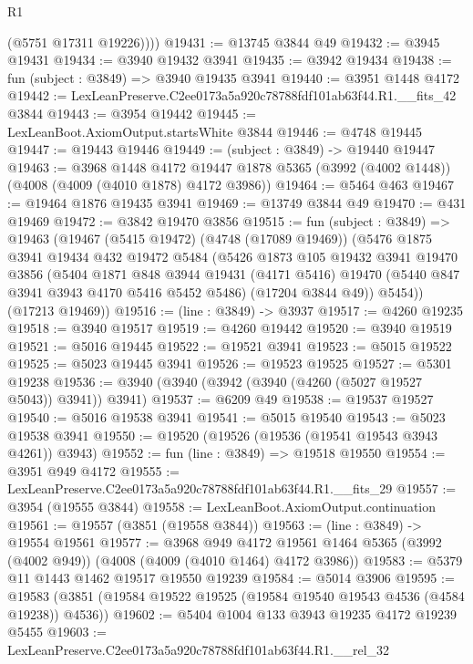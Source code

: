 \begin{lexlean}{R1}
\begin{coremodule}
          (@5751 @17311 @19226))))
@19431 := @13745 @3844 @49
@19432 := @3945 @19431
@19434 := @3940 @19432 @3941
@19435 := @3942 @19434
@19438 := fun (subject : @3849) => @3940 @19435 @3941
@19440 := @3951 @1448 @4172
@19442 := LexLeanPreserve.C2ee0173a5a920c78788fdf101ab63f44.R1.__fits_42 @3844
@19443 := @3954 @19442
@19445 := LexLeanBoot.AxiomOutput.startsWhite @3844
@19446 := @4748 @19445
@19447 := @19443 @19446
@19449 := (subject : @3849) -> @19440 @19447
@19463 := @3968
    @1448
    @4172
    @19447
    @1878
    @5365
    (@3992 (@4002 @1448))
    (@4008 (@4009 (@4010 @1878) @4172 @3986))
@19464 := @5464 @463
@19467 := @19464 @1876 @19435 @3941
@19469 := @13749 @3844 @49
@19470 := @431 @19469
@19472 := @3842 @19470 @3856
@19515 := fun (subject : @3849) =>
  @19463
    (@19467
      (@5415 @19472)
      (@4748 (@17089 @19469))
      (@5476
        @1875
        @3941
        @19434
        @432
        @19472
        @5484
        (@5426
          @1873
          @105
          @19432
          @3941
          @19470
          @3856
          (@5404
            @1871
            @848
            @3944
            @19431
            (@4171 @5416)
            @19470
            (@5440 @847 @3941 @3943 @4170 @5416 @5452 @5486)
            (@17204 @3844 @49))
          @5454))
      (@17213 @19469))
@19516 := (line : @3849) -> @3937
@19517 := @4260 @19235
@19518 := @3940 @19517
@19519 := @4260 @19442
@19520 := @3940 @19519
@19521 := @5016 @19445
@19522 := @19521 @3941
@19523 := @5015 @19522
@19525 := @5023 @19445 @3941
@19526 := @19523 @19525
@19527 := @5301 @19238
@19536 := @3940 (@3940 (@3942 (@3940 (@4260 (@5027 @19527 @5043)) @3941)) @3941)
@19537 := @6209 @49
@19538 := @19537 @19527
@19540 := @5016 @19538 @3941
@19541 := @5015 @19540
@19543 := @5023 @19538 @3941
@19550 := @19520 (@19526 (@19536 (@19541 @19543 @3943 @4261)) @3943)
@19552 := fun (line : @3849) => @19518 @19550
@19554 := @3951 @949 @4172
@19555 := LexLeanPreserve.C2ee0173a5a920c78788fdf101ab63f44.R1.__fits_29
@19557 := @3954 (@19555 @3844)
@19558 := LexLeanBoot.AxiomOutput.continuation
@19561 := @19557 (@3851 (@19558 @3844))
@19563 := (line : @3849) -> @19554 @19561
@19577 := @3968
    @949
    @4172
    @19561
    @1464
    @5365
    (@3992 (@4002 @949))
    (@4008 (@4009 (@4010 @1464) @4172 @3986))
@19583 := @5379 @11 @1443 @1462 @19517 @19550 @19239
@19584 := @5014 @3906
@19595 := @19583 (@3851 (@19584 @19522 @19525 (@19584 @19540 @19543 @4536 (@4584 @19238)) @4536))
@19602 := @5404 @1004 @133 @3943 @19235 @4172 @19239 @5455
@19603 := LexLeanPreserve.C2ee0173a5a920c78788fdf101ab63f44.R1.__rel_32

\end{coremodule}
\end{lexlean}

